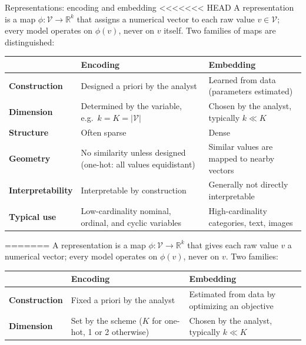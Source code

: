 \begin{frame}{Representations: encoding and embedding}
\begingroup\small
<<<<<<< HEAD
A representation is a map $\phi: \mathcal{V} \to \mathbb{R}^{k}$ that assigns a numerical vector to each raw value $v \in \mathcal{V}$; every model operates on $\phi(v)$, never on $v$ itself. Two families of maps are distinguished:
\par\endgroup
\vspace{0.5em}
\begingroup\footnotesize
\begin{tabularx}{\textwidth}{>{\bfseries}l >{\raggedright\arraybackslash}X >{\raggedright\arraybackslash}X}
& \bfseries Encoding & \bfseries Embedding \\
\toprule
Construction & Designed a priori by the analyst & Learned from data (parameters estimated) \\
\addlinespace[0.3em]
Dimension & Determined by the variable, e.g.\ $k = K = |\mathcal{V}|$ & Chosen by the analyst, typically $k \ll K$ \\
\addlinespace[0.3em]
Structure & Often sparse & Dense \\
\addlinespace[0.3em]
Geometry & No similarity unless designed (one-hot: all values equidistant) & Similar values are mapped to nearby vectors \\
\addlinespace[0.3em]
Interpretability & Interpretable by construction & Generally not directly interpretable \\
\addlinespace[0.3em]
Typical use & Low-cardinality nominal, ordinal, and cyclic variables & High-cardinality categories, text, images \\
\bottomrule
\end{tabularx}
\par\endgroup
=======
A representation is a map $\phi: \mathcal{V} \to \mathbb{R}^{k}$ that gives each raw value $v$ a numerical vector; every model operates on $\phi(v)$, never on $v$. Two families:
\par\endgroup
\vspace{0.6em}
\begingroup\small
\renewcommand{\arraystretch}{1.3}
\begin{tabularx}{\textwidth}{>{\bfseries}l >{\raggedright\arraybackslash}X >{\raggedright\arraybackslash}X}
& \bfseries Encoding & \bfseries Embedding \\
\toprule
Construction & Fixed a priori by the analyst & Estimated from data by optimizing an objective \\
\addlinespace[0.3em]
Dimension & Set by the scheme ($K$ for one-hot, 1 or 2 otherwise) & Chosen by the analyst, typically $k \ll K$ \\

\end{tabularx}
\end{frame}
